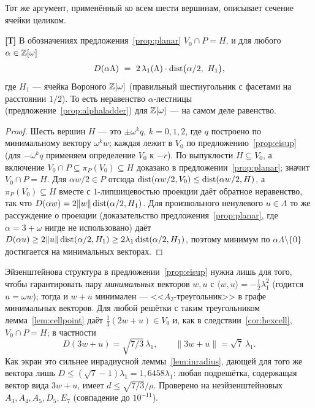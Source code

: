 Тот же аргумент, применённый ко всем шести вершинам, описывает сечение ячейки
целиком.

\begin{corollary}\label{cor:hexcell}
\textbf{[Т]} В обозначениях предложения~\ref{prop:planar}
$V_0\cap P=H$, и для любого $\alpha\in\mathbb{Z}[\omega]$
\[
D(\alpha\Lambda)\ =\ 2\,\lambda_1(\Lambda)\cdot\dist\bigl(\alpha/2,\ H_1\bigr),
\]
где $H_1$ --- ячейка Вороного $\mathbb{Z}[\omega]$ (правильный шестиугольник с фасетами
на расстоянии $1/2$). То есть неравенство $\alpha$-лестницы
(предложение~\ref{prop:alphaladder}) для $\mathbb{Z}[\omega]$ --- на самом деле
равенство.
\end{corollary}

\begin{proof}
Шесть вершин $H$ --- это $\pm\omega^kq$, $k=0,1,2$, где $q$ построено
по минимальному вектору $\omega^kw$; каждая лежит в $V_0$ по
предложению~\ref{prop:eisup} (для $-\omega^kq$ применяем определение $V_0$
к $-r$). По выпуклости $H\subseteq V_0$, а включение $V_0\cap P\subseteq
\pi_P(V_0)\subseteq H$ доказано в предложении~\ref{prop:planar}; значит
$V_0\cap P=H$. Для $\alpha w/2\in P$ отсюда
$\operatorname{dist}(\alpha w/2,V_0)\le\operatorname{dist}(\alpha w/2,H)$, а $\pi_P(V_0)\subseteq H$ вместе
с $1$-липшицевостью проекции даёт обратное неравенство, так что
$D(\alpha w)=2\|w\|\operatorname{dist}(\alpha/2,H_1)$. Для произвольного ненулевого
$u\in\Lambda$ то же рассуждение о проекции (доказательство
предложения~\ref{prop:planar}, где $\alpha=3+\omega$ нигде не использовано)
даёт $D(\alpha u)\ge2\|u\|\operatorname{dist}(\alpha/2,H_1)\ge2\lambda_1\operatorname{dist}(\alpha/2,H_1)$,
поэтому минимум по $\alpha\Lambda\setminus\{0\}$ достигается на минимальных
векторах.
\end{proof}

\begin{remark}\label{rem:a2tri}
Эйзенштейнова структура в предложении~\ref{prop:eisup} нужна лишь для того,
чтобы гарантировать пару \emph{минимальных} векторов $w,u$ с
$\langle w,u\rangle=-\frac12\lambda_1^2$ (годится $u=\omega w$); тогда и
$w+u$ минимален --- <<$A_2$-треугольник>> в графе минимальных векторов. Для
любой решётки с таким треугольником лемма~\ref{lem:cellpoint} даёт
$\frac13(2w+u)\in V_0$ и, как в следствии~\ref{cor:hexcell},
$V_0\cap P=H$; в частности
\[
D(3w+u)=\sqrt{7/3}\,\lambda_1,\qquad\|3w+u\|=\sqrt7\,\lambda_1 .
\]
Как экран это сильнее инрадиусной леммы~\ref{lem:inradius}, дающей для того же
вектора лишь $D\le(\sqrt7-1)\lambda_1=1{,}6458\lambda_1$: любая подрешётка,
содержащая вектор вида $3w+u$, имеет $d\le\sqrt{7/3}/\rho$. Проверено на
неэйзенштейновых $A_3,A_4,A_5,D_5,E_7$ (совпадение до $10^{-11}$).
\end{remark}

